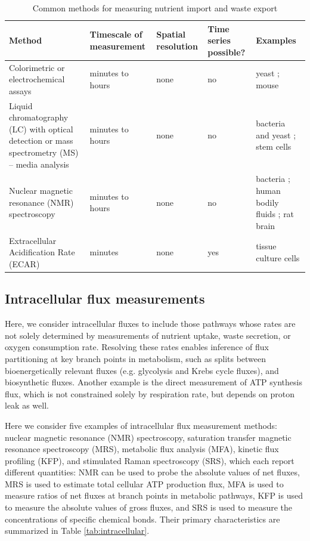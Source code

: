 \documentclass{compactarticle}
\begin{document}
\begin{table}[h]
\caption{Common methods for measuring nutrient import and waste export}
\label{tab:importexport}
\begin{center}
\begin{tabular}{|m{}|m{}|m{}|m{}|m{}|}
\hline
Method & Timescale of measurement & Spatial resolution & Time series possible? & Examples \\ \hline
Colorimetric or electrochemical assays  & minutes to hours & none & no & yeast \cite{bagamery2020putative}; mouse \cite{bernier2020microglial} \\ \hline
Liquid chromatography (LC) with optical detection or mass spectrometry (MS) – media analysis & minutes to hours  & none & no & bacteria and yeast \cite{paczia2012extensive}; stem cells \cite{ferreiro2011automated} \\ \hline
Nuclear magnetic resonance (NMR) spectroscopy & minutes to hours & none & no & bacteria \cite{birkenstock2012exometabolome}; human bodily fluids \cite{duarte2014nmr}; rat brain \cite{koga1988measurement} \\ \hline
Extracellular Acidification Rate (ECAR) & minutes & none & yes & tissue culture cells \cite{mookerjee2017quantifying} \\ \hline
\end{tabular}
\end{center}
\end{table}


\subsection{Intracellular flux measurements}

Here, we consider intracellular fluxes to include those pathways whose rates are not solely determined by measurements of nutrient uptake, waste secretion, or oxygen consumption rate. Resolving these rates enables inference of flux partitioning at key branch points in metabolism, such as splits between bioenergetically relevant fluxes (e.g. glycolysis and Krebs cycle fluxes), and biosynthetic fluxes. Another example is the direct measurement of ATP synthesis flux, which is not constrained solely by respiration rate, but depends on proton leak as well.

Here we consider five examples of intracellular flux measurement methods: nuclear magnetic resonance (NMR) spectroscopy,  saturation transfer magnetic resonance spectroscopy (MRS), metabolic flux analysis (MFA), kinetic flux profiling (KFP), and stimulated Raman spectroscopy (SRS), which each report different quantities: NMR can be used to probe the absolute values of net fluxes, MRS is used to estimate total cellular ATP production flux, MFA is used to measure ratios of net fluxes at branch points in metabolic pathways, KFP is used to measure the absolute values of gross fluxes, and SRS is used to measure the concentrations of specific chemical bonds. Their primary characteristics are summarized in Table \ref{tab:intracellular}.
\end{document}
